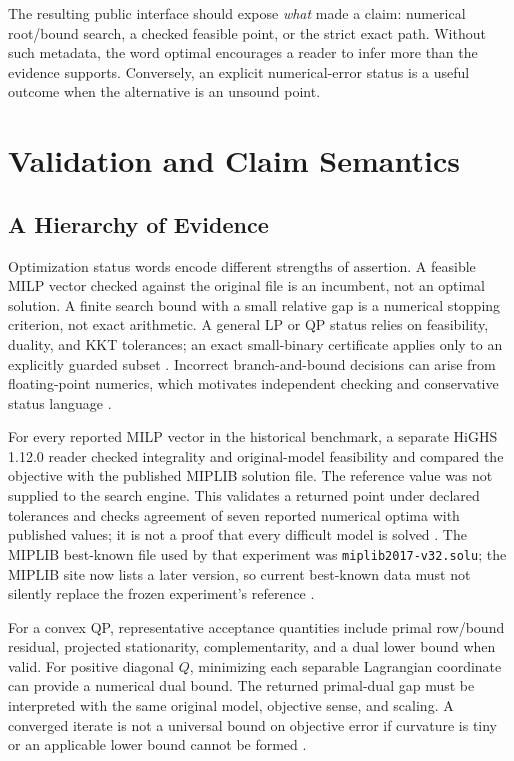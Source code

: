 \documentclass[10pt,a4paper,twocolumn]{article}
\newcommand{\smallpath}[1]{\nolinkurl{#1}}
\begin{document}
The resulting public interface should expose \emph{what} made a claim: numerical root/bound search, a checked feasible point, or the strict exact path. Without such metadata, the word optimal encourages a reader to infer more than the evidence supports. Conversely, an explicit numerical-error status is a useful outcome when the alternative is an unsound point.

\section{Validation and Claim Semantics}

\subsection{A Hierarchy of Evidence}

Optimization status words encode different strengths of assertion. A feasible MILP vector checked against the original file is an incumbent, not an optimal solution. A finite search bound with a small relative gap is a numerical stopping criterion, not exact arithmetic. A general LP or QP status relies on feasibility, duality, and KKT tolerances; an exact small-binary certificate applies only to an explicitly guarded subset \cite{arch}. Incorrect branch-and-bound decisions can arise from floating-point numerics, which motivates independent checking and conservative status language \cite{hoen2025,refine2016}.

For every reported MILP vector in the historical benchmark, a separate HiGHS 1.12.0 reader checked integrality and original-model feasibility and compared the objective with the published MIPLIB solution file. The reference value was not supplied to the search engine. This validates a returned point under declared tolerances and checks agreement of seven reported numerical optima with published values; it is not a proof that every difficult model is solved \cite{mip240}. The MIPLIB best-known file used by that experiment was \smallpath{miplib2017-v32.solu}; the MIPLIB site now lists a later version, so current best-known data must not silently replace the frozen experiment's reference \cite{miplibdownload}.

For a convex QP, representative acceptance quantities include primal row/bound residual, projected stationarity, complementarity, and a dual lower bound when valid. For positive diagonal $Q$, minimizing each separable Lagrangian coordinate can provide a numerical dual bound. The returned primal-dual gap must be interpreted with the same original model, objective sense, and scaling. A converged iterate is not a universal bound on objective error if curvature is tiny or an applicable lower bound cannot be formed \cite{qp9002,arch}.
\end{document}

